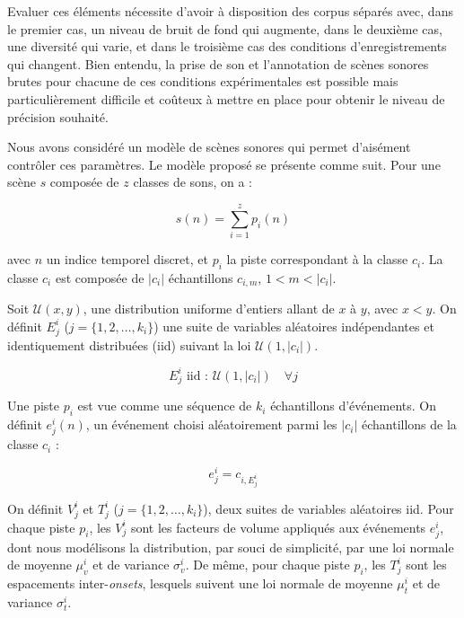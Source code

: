   Evaluer ces éléments nécessite d'avoir à disposition des corpus séparés avec, dans le premier cas, un niveau de bruit de fond qui augmente, dans le deuxième cas, une diversité qui varie, et dans le troisième cas des conditions d'enregistrements qui changent. Bien entendu, la prise de son et l'annotation de scènes sonores brutes pour chacune de ces conditions expérimentales est possible mais particulièrement difficile et coûteux à mettre en place pour obtenir le niveau de précision souhaité.

  Nous avons considéré un modèle de scènes sonores qui permet d'aisément contrôler ces paramètres. Le modèle proposé se présente comme suit. Pour une scène $s$ composée de $z$ classes de sons, on a :

  \begin{equation}
    s(n)=\sum_{i=1}^{z}p_i(n)
  \end{equation}

  avec $n$ un indice temporel discret, et $p_i$ la piste correspondant à la classe $c_i$. La classe $c_i$ est composée de $\vert c_i\vert$ échantillons $c_{i,m}$, $1<m<\vert c_i\vert$.

  Soit $\mathcal{U}(x,y)$, une distribution uniforme d'entiers allant de $x$ à $y$, avec $x<y$. On définit $E_j^i$ ($j=\lbrace 1,2,\ldots,k_i\rbrace$) une suite de variables aléatoires indépendantes et identiquement distribuées (iid) suivant la loi $\mathcal{U}(1,\vert c_i \vert)$.

  \begin{equation}
    E_j^i \textrm{ iid : } \mathcal{U}(1,\vert c_i \vert) \quad \forall j
  \end{equation}

  Une piste $p_i$ est vue comme une séquence de $k_i$ échantillons d'événements. On définit $e_j^i(n)$, un événement choisi aléatoirement parmi les $\vert c_i\vert$ échantillons de la classe $c_i$ :

  \begin{equation}
    e_j^i=c_{i,E_j^i}
  \end{equation}

  On définit $V^i_j$ et $T^i_j$ ($j=\lbrace 1,2,\ldots,k_i\rbrace$), deux suites de variables aléatoires iid. Pour chaque piste $p_i$, les $V^i_j$ sont les facteurs de volume appliqués aux événements $e_j^i$, dont nous modélisons la distribution, par souci de simplicité, par une loi normale de moyenne $\mu_v^i$ et de variance $\sigma_v^i$. De même, pour chaque piste $p_i$, les $T_j^i$ sont les espacements inter-\emph{onsets}, lesquels suivent une loi normale de moyenne $\mu_t^i$ et de variance $\sigma_t^i$.

